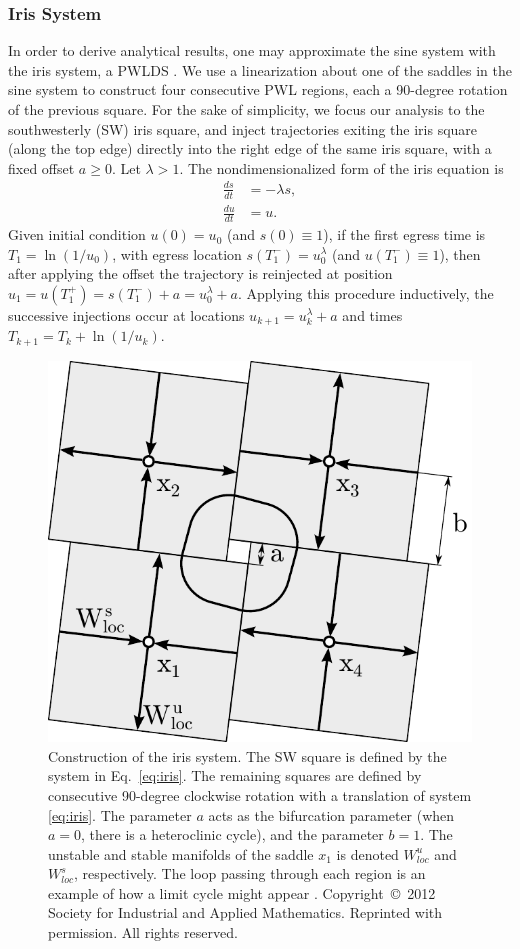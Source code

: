 \documentclass[12pt]{article}
\begin{document}
\subsubsection{Iris System}\label{app:iris}
In order to derive analytical results, one may approximate the sine system with the iris system, a PWLDS \cite{ShawParkChielThomas2012SIADS}.  We use a linearization about one of the saddles in the sine system to construct four consecutive PWL regions, each a 90-degree rotation of the previous square.  For the sake of simplicity, we focus our analysis to the southwesterly (SW) iris square, and inject trajectories exiting the iris square (along the top edge) directly into the right edge of the same iris square, with a fixed offset $a\ge 0$.  Let $\lambda > 1$.  The nondimensionalized form of the iris equation is  
\begin{equation}
 \begin{split}
  \frac{ds}{dt} &= -\lambda s,\\
  \frac{du}{dt} &= u.
 \end{split}
\label{eq:iris}\end{equation}
Given initial condition $u(0)=u_0$ (and $s(0)\equiv 1$), if the first egress time is $T_1=\ln(1/u_0)$, with egress location $s(T_1^-)=u_0^\lambda$ (and $u(T_1^-)\equiv 1$), then after applying the offset the trajectory is reinjected at position $u_1=u(T_1^+)=s(T_1^-)+a=u_0^\lambda+a$.  Applying this procedure inductively, the successive injections occur at locations $u_{k+1}=u_k^\lambda+a$ and times $T_{k+1}=T_k+\ln(1/u_k)$.  

\begin{figure}[h!]
\begin{center}
 \includegraphics[width=.5\textwidth]{sine_to_iris_fig_sketch_iris.pdf}
\end{center}
\caption[Construction of the iris system]{Construction of the iris system.  The SW square is defined by the system in Eq.~\eqref{eq:iris}.  The remaining squares are defined by consecutive 90-degree clockwise rotation with a translation of system \eqref{eq:iris}.  The parameter $a$ acts as the bifurcation parameter (when $a=0$, there is a heteroclinic cycle), and the parameter $b = 1$. The unstable and stable manifolds of the saddle $x_1$ is denoted $W_{loc}^u$ and $W_{loc}^s$, respectively.  The loop passing through each  %
region is an example of how a limit cycle might appear \cite{ShawParkChielThomas2012SIADS}. %
Copyright~\copyright~2012 Society for Industrial and Applied Mathematics.  Reprinted with permission.  All rights reserved.}\label{fig:iris}
\end{figure}
\end{document}
